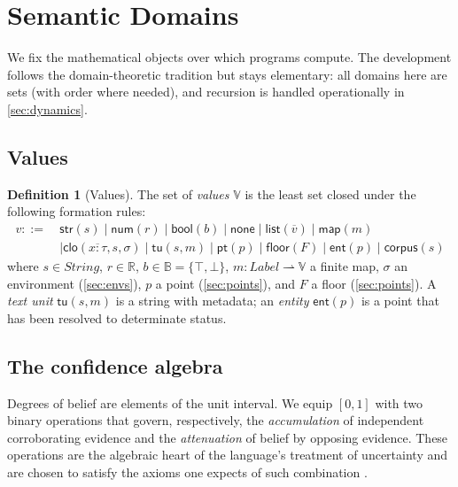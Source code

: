\documentclass[11pt,a4paper]{article}
\theoremstyle{plain}
\theoremstyle{definition}
\newtheorem{definition}[theorem]{Definition}
\theoremstyle{remark}
\newcommand{\env}{\sigma}
\newcommand{\Val}{\mathbb{V}}
\newcommand{\Unit}{[0,1]}
\begin{document}
\section{Semantic Domains}
\label{sec:domains}

We fix the mathematical objects over which programs compute. The development
follows the domain-theoretic tradition \citep{scott1976,stoy1977,winskel1993}
but stays elementary: all domains here are sets (with order where needed), and
recursion is handled operationally in \cref{sec:dynamics}.

\subsection{Values}
\label{sec:values}

\begin{definition}[Values]
\label{def:values}
The set of \emph{values} $\Val$ is the least set closed under the following
formation rules:
\begin{align*}
v ::=\ &\mathsf{str}(s) \mid \mathsf{num}(r) \mid \mathsf{bool}(b) \mid
        \mathsf{none}
      \mid \mathsf{list}(\overline{v}) \mid \mathsf{map}(m)\\
     &\mid \mathsf{clo}(\overline{x{:}\tau}, s, \env) \mid \mathsf{tu}(s, m)
      \mid \mathsf{pt}(p) \mid \mathsf{floor}(F) \mid \mathsf{ent}(p) \mid
      \mathsf{corpus}(s)
\end{align*}
where $s\in\mathit{String}$, $r\in\mathbb{R}$, $b\in\mathbb{B}=\{\top,\bot\}$,
$m\colon \mathit{Label}\rightharpoonup\Val$ a finite map, $\env$ an environment
(\cref{sec:envs}), $p$ a point (\cref{sec:points}), and $F$ a floor
(\cref{sec:points}). A \emph{text unit} $\mathsf{tu}(s,m)$ is a string with
metadata; an \emph{entity} $\mathsf{ent}(p)$ is a point that has been resolved
to determinate status.
\end{definition}

\subsection{The confidence algebra}
\label{sec:confalg}

Degrees of belief are elements of the unit interval. We equip $\Unit$ with two
binary operations that govern, respectively, the \emph{accumulation} of
independent corroborating evidence and the \emph{attenuation} of belief by
opposing evidence. These operations are the algebraic heart of the language's
treatment of uncertainty and are chosen to satisfy the axioms one expects of
such combination \citep{cox1946,shafer1976,jaynes2003}.
\end{document}
